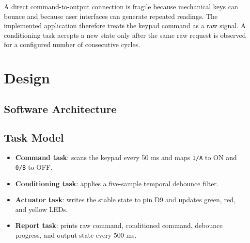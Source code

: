 \documentclass[12pt]{article}
\begin{document}
A direct command-to-output connection is fragile because mechanical keys can bounce and because user interfaces can generate repeated readings. The implemented application therefore treats the keypad command as a raw signal. A conditioning task accepts a new state only after the same raw request is observed for a configured number of consecutive cycles.

\section{Design}
\subsection{Software Architecture}
\begin{center}
\end{center}

\subsection{Task Model}
\begin{itemize}
  \item \textbf{Command task}: scans the keypad every 50 ms and maps \texttt{1/A} to ON and \texttt{0/B} to OFF.
  \item \textbf{Conditioning task}: applies a five-sample temporal debounce filter.
  \item \textbf{Actuator task}: writes the stable state to pin D9 and updates green, red, and yellow LEDs.
  \item \textbf{Report task}: prints raw command, conditioned command, debounce progress, and output state every 500 ms.
\end{itemize}
\end{document}
